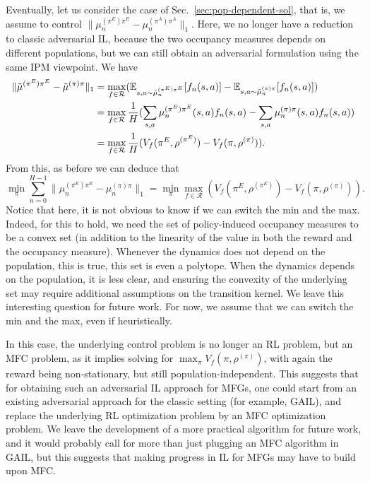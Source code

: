 \documentclass{article}
\begin{document}
Eventually, let us consider the case of Sec.~\ref{sec:pop-dependent-sol}, that is, we assume to control $\|\mu_n^{(\pi^E)\pi^{E}} - \mu_n^{(\pi^A)\pi^{A}}\|_1$. Here, we no longer have a reduction to classic adversarial IL, because the two occupancy measures depends on different populations, but we can still obtain an adversarial formulation using the same IPM viewpoint. We have
\begin{align}
    \|\tilde{\mu}^{(\pi^E)\pi^{E}} - \tilde{\mu}^{(\pi)\pi}\|_1 &= \max_{f\in \mathcal{R}} (\mathbb{E}_{s,a\sim\tilde{\mu}_n^{(\pi^E)\pi^{E}}}[f_n(s,a)]-\mathbb{E}_{s,a\sim\tilde{\mu}_n^{(\pi)\pi}}[f_n(s,a)])
    \\
    &= \max_{f\in \mathcal{R}} \frac{1}{H} (\sum_{s,a} \mu_n^{(\pi^E)\pi^{E}}(s,a) f_n(s,a) - \sum_{s,a} \mu_n^{(\pi)\pi}(s,a) f_n(s,a))
    \\
    &= \max_{f\in \mathcal{R}} \frac{1}{H} (V_f(\pi^E, \rho^{(\pi^E)}) - V_f(\pi, \rho^{(\pi)})).
\end{align}
From this, as before we can deduce that
\begin{equation}
    \min_\pi \sum_{n=0}^{H-1}\|\mu_n^{(\pi^E)\pi^{E}} - \mu_n^{(\pi)\pi}\|_1 = \min_\pi\max_{f\in\mathcal{R}}  (V_f(\pi^E, \rho^{(\pi^E)}) - V_f(\pi, \rho^{(\pi)})).
\end{equation}
Notice that here, it is not obvious to know if we can switch the min and the max. Indeed, for this to hold, we need the set of policy-induced occupancy measures to be a convex set (in addition to the linearity of the value in both the reward and the occupancy measure). Whenever the dynamics does not depend on the population, this is true, this set is even a polytope. When the dynamics depends on the population, it is less clear, and ensuring the convexity of the underlying set may require additional assumptions on the transition kernel. We leave this interesting question for future work. For now, we assume that we can switch the min and the max, even if heuristically.

In this case, the underlying control problem is no longer an RL problem, but an MFC problem, as it implies solving for $\max_\pi V_f(\pi, \rho^{(\pi)})$, with again the reward being non-stationary, but still population-independent. This suggests that for obtaining such an adversarial IL approach for MFGs, one could start from an existing adversarial approach for the classic setting (for example, GAIL), and replace the underlying RL optimization problem by an  MFC optimization problem. We leave the development of a more practical algorithm for future work, and it would probably call for more than just plugging an MFC algorithm in GAIL, but this suggests that making progress in IL for MFGs may have to build upon MFC.
\end{document}
